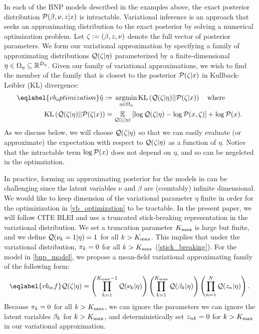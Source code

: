 In each of the BNP models described in the examples above,
the exact posterior distribution $\mathcal{P}(\beta, \nu, z \vert x)$
is intractable.
Variational inference is an approach that seeks an approximating distribution
to the exact posterior by solving a numerical optimization problem.
Let $\zeta := (\beta, z, \nu)$ denote the full vector of
posterior parameters.  We form our variational approximation by specifying a
family of approximating distributions $\mathcal{Q}(\zeta \vert \eta)$
parameterized by a finite-dimensional $\eta \in \Omega_{\eta} \subseteq
\mathbb{R}^{{D_{\eta}}}$.
Given our family of variational approximations, we wish to find the member of
the family that is closest to the posterior $\mathcal{P}(\zeta \vert x)$ in
Kullback-Leibler (KL) divergence:
%
\begin{align}\eqlabel{vb_optimization}
%
\etaopt :={}&
    \argmin_{\eta \in \etadom}
        \KL{\q(\zeta \vert \eta) || \p(\zeta \vert \x)} \mathwhere \\
\KL{\q(\zeta \vert \eta) || \p(\zeta \vert \x)}
={}&    \expect{\q(\zeta \vert \eta)}{
        \log \q(\zeta \vert \eta) - \logp(\x, \zeta)} + \logp(\x). \nonumber
%
\end{align}
%
As we discuss
below, we will choose $\mathcal{Q}(\zeta \vert \eta)$ so that we can easily evaluate (or approximate)
the expectation with respect to $\mathcal{Q}(\zeta \vert \eta)$
as a function of $\eta$.
Notice that the intractable term $\log \mathcal{P}(x)$ does not depend on $\eta$, and
so can be negelcted in the optimziation.

In practice, forming an approximating posterior for the models in
can be challenging since the latent variables $\nu$ and $\beta$ are
(countably) infinite dimensional.
We would like to keep dimension of the variational parameter $\eta$ finite
in order for the optimizization in \eqref{vb_optimization} to be tractable.
In the present paper, we will follow CITE BLEI and
use a truncated stick-breaking representation in
the variational distribution.
We set a truncation parameter ${K_{\mathrm{max}}}$ is large but finite,
and we define $\mathcal{Q}(\nu_k = 1 | \eta) = 1$ for all $k > {K_{\mathrm{max}}}$.
This implies that under the variational distribution, $\pi_k = 0$ for all $k > {K_{\mathrm{max}}}$
(\eqref{stick_breaking}).
For the model in \eqref{bnp_model},
we propose a mean-field variational approximating family of the following form:
%
\begin{align}\eqlabel{vb_mf}
%
\q(\zeta \vert \eta) =
    \left( \prod_{\k=1}^{\kmax - 1} \q(\nuk \vert \eta) \right)
    \left( \prod_{\k=1}^{\kmax} \q(\beta_\k \vert \eta) \right)
    \left( \prod_{\n=1}^{\N} \q(\z_{\n} \vert \eta) \right).
%
\end{align}
Because $\pi_k = 0$ for all $k > {K_{\mathrm{max}}}$, we can ignore the
parameters we can ignore the latent variables $\beta_k$ for $k > {K_{\mathrm{max}}}$,
and deterministically set $z_{nk} = 0$ for $k > {K_{\mathrm{max}}}$ in our variational approximation.


